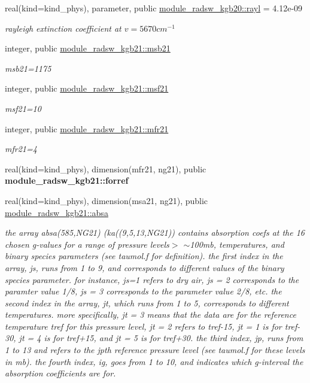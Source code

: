 \begin{Indent}
\begin{DoxyCompactItemize}
real(kind=kind\+\_\+phys), parameter, public \hyperlink{group__module__radsw__kgbnn_ga6a00db6ce81c299d44ef5eadc1fe3b5b}{module\+\_\+radsw\+\_\+kgb20\+::rayl} = 4.\+12e-\/09
\begin{DoxyCompactList}\small\item\em rayleigh extinction coefficient at $v=5670cm^{-1}$ \end{DoxyCompactList}\item 
integer, public \hyperlink{group__module__radsw__kgbnn_ga59710ca5b31c30385ea968c0f01e2e81}{module\+\_\+radsw\+\_\+kgb21\+::msb21}
\begin{DoxyCompactList}\small\item\em msb21=1175 \end{DoxyCompactList}\item 
integer, public \hyperlink{group__module__radsw__kgbnn_gae70b5abfa847419cbf189d2502c34ddd}{module\+\_\+radsw\+\_\+kgb21\+::msf21}
\begin{DoxyCompactList}\small\item\em msf21=10 \end{DoxyCompactList}\item 
integer, public \hyperlink{group__module__radsw__kgbnn_ga5575239aa9d55abcca1ac1f82dc4c4ec}{module\+\_\+radsw\+\_\+kgb21\+::mfr21}
\begin{DoxyCompactList}\small\item\em mfr21=4 \end{DoxyCompactList}\item 
real(kind=kind\+\_\+phys), dimension(mfr21, ng21), public {\bfseries module\+\_\+radsw\+\_\+kgb21\+::forref}
\item 
real(kind=kind\+\_\+phys), dimension(msa21, ng21), public \hyperlink{group__module__radsw__kgbnn_ga7cce83c282d3efec6a3fe319480c270a}{module\+\_\+radsw\+\_\+kgb21\+::absa}
\begin{DoxyCompactList}\small\item\em the array absa(585,\+N\+G21) (ka((9,5,13,\+N\+G21)) contains absorption coefs at the 16 chosen g-\/values for a range of pressure levels$>$ $\sim$100mb, temperatures, and binary species parameters (see taumol.\+f for definition). the first index in the array, js, runs from 1 to 9, and corresponds to different values of the binary species parameter. for instance, js=1 refers to dry air, js = 2 corresponds to the paramter value 1/8, js = 3 corresponds to the parameter value 2/8, etc. the second index in the array, jt, which runs from 1 to 5, corresponds to different temperatures. more specifically, jt = 3 means that the data are for the reference temperature tref for this pressure level, jt = 2 refers to tref-\/15, jt = 1 is for tref-\/30, jt = 4 is for tref+15, and jt = 5 is for tref+30. the third index, jp, runs from 1 to 13 and refers to the jpth reference pressure level (see taumol.\+f for these levels in mb). the fourth index, ig, goes from 1 to 10, and indicates which g-\/interval the absorption coefficients are for. \end{DoxyCompactList}\item 

\end{DoxyCompactItemize}
\end{Indent}
